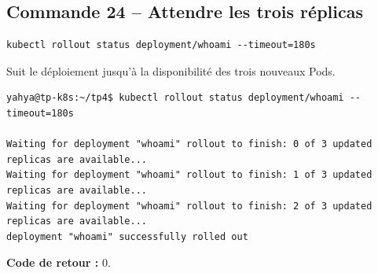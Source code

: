 \documentclass[11pt,a4paper]{article}
\begin{document}
\subsection{Commande 24 -- Attendre les trois réplicas}
\begin{lstlisting}
kubectl rollout status deployment/whoami --timeout=180s
\end{lstlisting}
Suit le déploiement jusqu’à la disponibilité des trois nouveaux Pods.
\begin{tcolorbox}[terminal,title={Ubuntu / WSL2 -- Commande 24 -- rendu reconstitué}]
\begin{Verbatim}[fontsize=\scriptsize,breaklines=true,breakanywhere=true,breaksymbolleft={},breaksymbolright={}]
yahya@tp-k8s:~/tp4$ kubectl rollout status deployment/whoami --timeout=180s

Waiting for deployment "whoami" rollout to finish: 0 of 3 updated replicas are available...
Waiting for deployment "whoami" rollout to finish: 1 of 3 updated replicas are available...
Waiting for deployment "whoami" rollout to finish: 2 of 3 updated replicas are available...
deployment "whoami" successfully rolled out
\end{Verbatim}
\end{tcolorbox}
\textbf{Code de retour :} 0.
\end{document}
